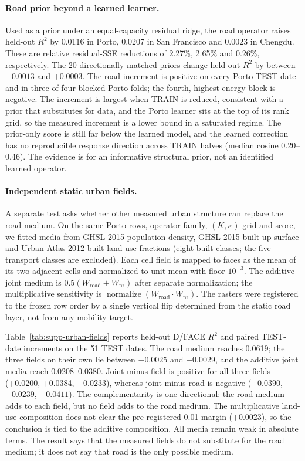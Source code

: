 \paragraph{Road prior beyond a learned learner.} Used as a prior under an equal-capacity residual ridge, the road operator raises held-out $R^2$ by 0.0116 in Porto, 0.0207 in San Francisco and 0.0023 in Chengdu. These are relative residual-SSE reductions of 2.27\%, 2.65\% and 0.26\%, respectively. The 20 directionally matched priors change held-out $R^2$ by between $-0.0013$ and $+0.0003$. The road increment is positive on every Porto TEST date and in three of four blocked Porto folds; the fourth, highest-energy block is negative. The increment is largest when TRAIN is reduced, consistent with a prior that substitutes for data, and the Porto learner sits at the top of its rank grid, so the measured increment is a lower bound in a saturated regime. The prior-only score is still far below the learned model, and the learned correction has no reproducible response direction across TRAIN halves (median cosine 0.20--0.46). The evidence is for an informative structural prior, not an identified learned operator.

\paragraph{Independent static urban fields.} A separate test asks whether other measured urban structure can replace the road medium. On the same Porto rows, operator family, $(K,\kappa)$ grid and score, we fitted media from GHSL 2015 population density, GHSL 2015 built-up surface and Urban Atlas 2012 built land-use fractions (eight built classes; the five transport classes are excluded). Each cell field is mapped to faces as the mean of its two adjacent cells and normalized to unit mean with floor $10^{-3}$. The additive joint medium is $0.5(W_{\mathrm{road}}+W_{\mathrm{nr}})$ after separate normalization; the multiplicative sensitivity is $\operatorname{normalize}(W_{\mathrm{road}}\cdot W_{\mathrm{nr}})$. The rasters were registered to the frozen row order by a single vertical flip determined from the static road layer, not from any mobility target.

Table~\ref{tab:supp-urban-fields} reports held-out D/FACE $R^2$ and paired TEST-date increments on the 51 TEST dates. The road medium reaches 0.0619; the three fields on their own lie between $-0.0025$ and $+0.0029$, and the additive joint media reach 0.0208--0.0380. Joint minus field is positive for all three fields (+0.0200, +0.0384, +0.0233), whereas joint minus road is negative ($-0.0390$, $-0.0239$, $-0.0411$). The complementarity is one-directional: the road medium adds to each field, but no field adds to the road medium. The multiplicative land-use composition does not clear the pre-registered 0.01 margin ($+0.0023$), so the conclusion is tied to the additive composition. All media remain weak in absolute terms. The result says that the measured fields do not substitute for the road medium; it does not say that road is the only possible medium.

